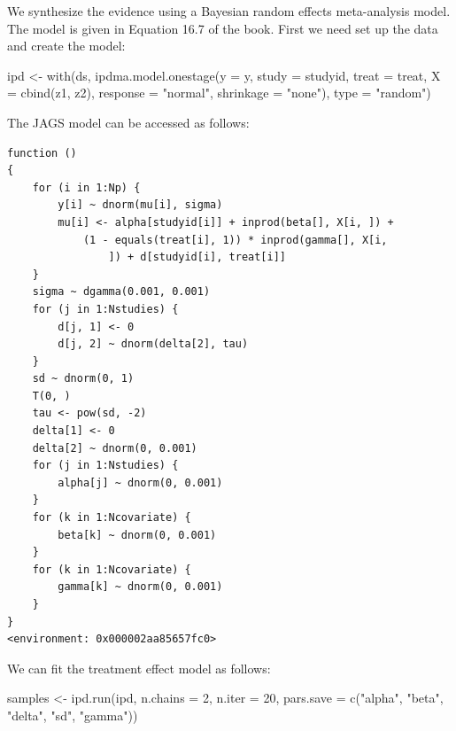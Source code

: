 \documentclass[
  letterpaper,
  DIV=11,
  numbers=noendperiod]{scrreprt}
\newenvironment{Shaded}{\begin{snugshade}}{\end{snugshade}}
\newcommand{\AttributeTok}[1]{\textcolor[rgb]{0.40,0.45,0.13}{#1}}
\newcommand{\DecValTok}[1]{\textcolor[rgb]{0.68,0.00,0.00}{#1}}
\newcommand{\FunctionTok}[1]{\textcolor[rgb]{0.28,0.35,0.67}{#1}}
\newcommand{\NormalTok}[1]{\textcolor[rgb]{0.00,0.23,0.31}{#1}}
\newcommand{\OtherTok}[1]{\textcolor[rgb]{0.00,0.23,0.31}{#1}}
\newcommand{\SpecialCharTok}[1]{\textcolor[rgb]{0.37,0.37,0.37}{#1}}
\newcommand{\StringTok}[1]{\textcolor[rgb]{0.13,0.47,0.30}{#1}}
\begin{document}
We synthesize the evidence using a Bayesian random effects meta-analysis
model. The model is given in Equation 16.7 of the book. First we need
set up the data and create the model:

\begin{Shaded}
\begin{Highlighting}[]
\NormalTok{ipd }\OtherTok{\textless{}{-}} \FunctionTok{with}\NormalTok{(ds, }\FunctionTok{ipdma.model.onestage}\NormalTok{(}\AttributeTok{y =}\NormalTok{ y, }\AttributeTok{study =}\NormalTok{ studyid, }\AttributeTok{treat =}\NormalTok{ treat,}
                                     \AttributeTok{X =} \FunctionTok{cbind}\NormalTok{(z1, z2), }
                                     \AttributeTok{response =} \StringTok{"normal"}\NormalTok{, }
                                     \AttributeTok{shrinkage =} \StringTok{"none"}\NormalTok{), }
                                     \AttributeTok{type =} \StringTok{"random"}\NormalTok{)}
\end{Highlighting}
\end{Shaded}

The JAGS model can be accessed as follows:

\begin{Shaded}
\end{Shaded}

\begin{verbatim}
function () 
{
    for (i in 1:Np) {
        y[i] ~ dnorm(mu[i], sigma)
        mu[i] <- alpha[studyid[i]] + inprod(beta[], X[i, ]) + 
            (1 - equals(treat[i], 1)) * inprod(gamma[], X[i, 
                ]) + d[studyid[i], treat[i]]
    }
    sigma ~ dgamma(0.001, 0.001)
    for (j in 1:Nstudies) {
        d[j, 1] <- 0
        d[j, 2] ~ dnorm(delta[2], tau)
    }
    sd ~ dnorm(0, 1)
    T(0, )
    tau <- pow(sd, -2)
    delta[1] <- 0
    delta[2] ~ dnorm(0, 0.001)
    for (j in 1:Nstudies) {
        alpha[j] ~ dnorm(0, 0.001)
    }
    for (k in 1:Ncovariate) {
        beta[k] ~ dnorm(0, 0.001)
    }
    for (k in 1:Ncovariate) {
        gamma[k] ~ dnorm(0, 0.001)
    }
}
<environment: 0x000002aa85657fc0>
\end{verbatim}

We can fit the treatment effect model as follows:

\begin{Shaded}
\begin{Highlighting}[]
\NormalTok{samples }\OtherTok{\textless{}{-}} \FunctionTok{ipd.run}\NormalTok{(ipd, }\AttributeTok{n.chains =} \DecValTok{2}\NormalTok{, }\AttributeTok{n.iter =} \DecValTok{20}\NormalTok{,}
                   \AttributeTok{pars.save =} \FunctionTok{c}\NormalTok{(}\StringTok{"alpha"}\NormalTok{, }\StringTok{"beta"}\NormalTok{, }\StringTok{"delta"}\NormalTok{, }\StringTok{"sd"}\NormalTok{, }\StringTok{"gamma"}\NormalTok{))}
\end{Highlighting}
\end{Shaded}
\end{document}
